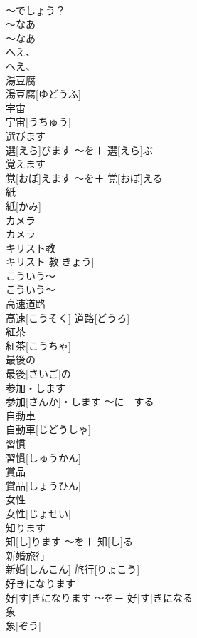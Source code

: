 \documentclass[8pt]{extreport}
\begin{document}
\begin{CJK}{UTF8}{min}
\\	〜でしょう？		
\\	〜なあ	
\\	〜なあ		
\\	へえ、	
\\	へえ、		
\\	湯豆腐	
\\	湯豆腐[ゆどうふ]		
\\	宇宙	
\\	宇宙[うちゅう]		
\\	選びます	
\\	選[えら]びます	〜を＋ 選[えら]ぶ	
\\	覚えます	
\\	覚[おぼ]えます	〜を＋ 覚[おぼ]える	
\\	紙	
\\	紙[かみ]		
\\	カメラ	
\\	カメラ		
\\	キリスト教	
\\	キリスト 教[きょう]		
\\	こういう〜	
\\	こういう〜		
\\	高速道路	
\\	高速[こうそく] 道路[どうろ]		
\\	紅茶	
\\	紅茶[こうちゃ]		
\\	最後の	
\\	最後[さいご]の		
\\	参加・します	
\\	参加[さんか]・します	〜に＋する	
\\	自動車	
\\	自動車[じどうしゃ]		
\\	習慣	
\\	習慣[しゅうかん]		
\\	賞品	
\\	賞品[しょうひん]		
\\	女性	
\\	女性[じょせい]		
\\	知ります	
\\	知[し]ります	〜を＋ 知[し]る	
\\	新婚旅行	
\\	新婚[しんこん] 旅行[りょこう]		
\\	好きになります	
\\	好[す]きになります	〜を＋ 好[す]きになる	
\\	象	
\\	象[ぞう]		

\end{CJK}
\end{document}
